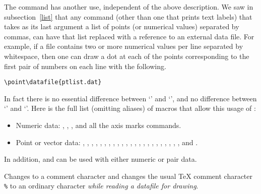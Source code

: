 \documentclass[letterpaper]{article}
\begin{document}
The  command has another use,
independent of the above description. We saw in subsection~\ref{list}
that any \mfp{} command (other than one that prints text labels) that
takes as its last argument a list of points (or numerical values)
separated by commas, can have that list replaced with a reference to an
external data file. For example, if a file  contains
two or more numerical values per line separated by whitespace, then one
can draw a dot at each of the points corresponding to the first pair of
numbers on each line with the following.
\begin{verbatim}
\point\datafile{ptlist.dat}
\end{verbatim}
In fact there is no essential difference between `'
and `', and no difference between
`' and `'.
Here is the full list (omitting aliases) of \mfp{} macros that allow
this usage of :
\begin{itemize}
\raggedright
\item Numeric data: , , ,
     and
    all the axis marks commands.
\item Point or vector data:
    , , ,
    , , ,
    , , , ,
    , , , ,
    , , , ,
    , ,  , ,
    , and .
\end{itemize}
In addition,  and  can be used with
either numeric or pair data.

\begin{cd}
\cs{}%
\end{cd}

Changes  to a comment character and changes the usual \TeX{}
comment character \texttt{\%} to an ordinary character \emph{while reading a
datafile for drawing}.

\begin{cd}
%
\end{cd}
\end{document}
